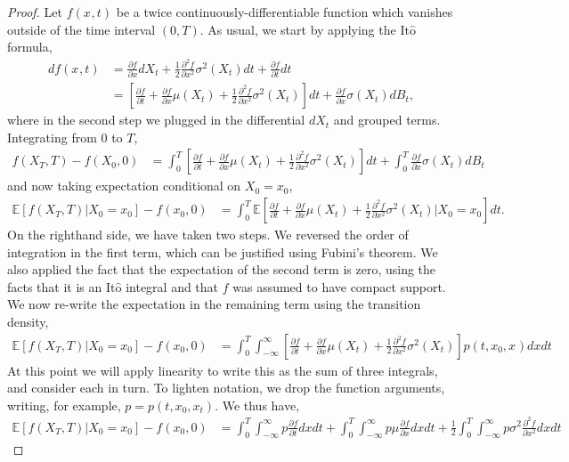 \documentclass[12pt]{article}
\newcommand{\E}{\mathbb{E}}
\newcommand{\state}[1][t]{X_{#1}}
\newcommand{\stateValue}[1][t]{x_{#1}}
\newcommand{\BM}[1][t]{B_{#1}} %
\newcommand{\ito}{\text{It}\hat{\text{o}}}
\begin{document}
\begin{proof}
Let $f(\stateValue[], t)$ be a twice continuously-differentiable function which vanishes outside of the time interval $(0, T)$. As usual, we start by applying the 
$\ito$ formula,
\begin{align*}
df(\stateValue[], t) 
&= \frac{\partial f}{\partial x} d\state + \frac{1}{2} \frac{\partial^2 f}{\partial x^2} \sigma^2(\state) dt + \frac{\partial f}{\partial t} dt \\
&= \left[\frac{\partial f}{\partial t} + \frac{\partial f}{\partial x}\mu(\state) + \frac{1}{2}\frac{\partial^2 f}{\partial x^2}\sigma^2(\state) \right]dt + \frac{\partial f}{\partial x}\sigma(\state) d\BM,
\end{align*}
where in the second step we plugged in the differential $d\state$ and grouped terms. Integrating from $0$ to $T$, 
\begin{align*}
f(\state[T], T) - f(\state[0], 0) 
&= \int_{0}^{T} \left[\frac{\partial f}{\partial t} + \frac{\partial f}{\partial x}\mu(\state) + \frac{1}{2}\frac{\partial^2 f}{\partial x^2}\sigma^2(\state) \right]dt 
	+ \int_{0}^{T} \frac{\partial f}{\partial x}\sigma(\state) d\BM
\end{align*}
and now taking expectation conditional on $\state[0] = \stateValue[0]$,
\begin{align*}
\E[f(\state[T], T) | \state[0] = \stateValue[0]] - f(\stateValue[0], 0)
&= \int_{0}^{T} \E\left[\frac{\partial f}{\partial t} + \frac{\partial f}{\partial x}\mu(\state) + \frac{1}{2}\frac{\partial^2 f}{\partial x^2}\sigma^2(\state) \bigg| \state[0] = \stateValue[0] \right]dt.
\end{align*}
On the righthand side, we have taken two steps. We reversed the order of integration in the first term, which can be justified using Fubini's theorem.
We also applied the fact that the expectation of the second term is zero, using the facts that it is an $\ito$ integral and that $f$ was assumed to have compact support. 
We now re-write the expectation in the remaining term using the transition density, 
\begin{align*}
\E[f(\state[T], T) | \state[0] = \stateValue[0]] - f(\stateValue[0], 0)
&= \int_{0}^{T} \int_{-\infty}^{\infty} \left[\frac{\partial f}{\partial t} + \frac{\partial f}{\partial x}\mu(\state) + \frac{1}{2}\frac{\partial^2 f}{\partial x^2}\sigma^2(\state)\right] p(t,\stateValue[0],\stateValue[]) dx dt
\end{align*}
At this point we will apply linearity to write this as the sum of three integrals, and consider each in turn. To lighten notation, we drop the function arguments, writing, for example, 
$p = p(t, \stateValue[0], \stateValue)$. We thus have, 
\begin{align*}
\E[f(\state[T], T) | \state[0] = \stateValue[0]] - f(\stateValue[0], 0)
&= \int_{0}^{T} \int_{-\infty}^{\infty} p\frac{\partial f}{\partial t} dxdt + \int_{0}^{T} \int_{-\infty}^{\infty} p\mu \frac{\partial f}{\partial x} dxdt + \frac{1}{2} \int_{0}^{T} \int_{-\infty}^{\infty} p\sigma^2 \frac{\partial^2 f}{\partial x^2} dxdt
\end{align*}


\end{proof}
\end{document}
